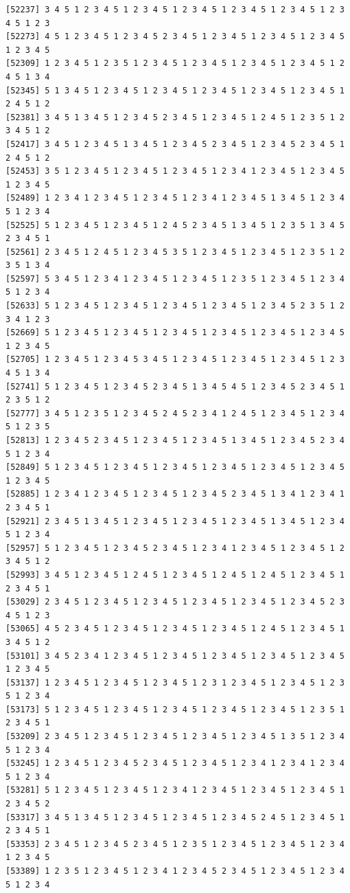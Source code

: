 \documentclass[
  english,
]{book}
\begin{document}
\begin{verbatim}
[52237] 3 4 5 1 2 3 4 5 1 2 3 4 5 1 2 3 4 5 1 2 3 4 5 1 2 3 4 5 1 2 3 4 5 1 2 3
[52273] 4 5 1 2 3 4 5 1 2 3 4 5 2 3 4 5 1 2 3 4 5 1 2 3 4 5 1 2 3 4 5 1 2 3 4 5
[52309] 1 2 3 4 5 1 2 3 5 1 2 3 4 5 1 2 3 4 5 1 2 3 4 5 1 2 3 4 5 1 2 4 5 1 3 4
[52345] 5 1 3 4 5 1 2 3 4 5 1 2 3 4 5 1 2 3 4 5 1 2 3 4 5 1 2 3 4 5 1 2 4 5 1 2
[52381] 3 4 5 1 3 4 5 1 2 3 4 5 2 3 4 5 1 2 3 4 5 1 2 4 5 1 2 3 5 1 2 3 4 5 1 2
[52417] 3 4 5 1 2 3 4 5 1 3 4 5 1 2 3 4 5 2 3 4 5 1 2 3 4 5 2 3 4 5 1 2 4 5 1 2
[52453] 3 5 1 2 3 4 5 1 2 3 4 5 1 2 3 4 5 1 2 3 4 1 2 3 4 5 1 2 3 4 5 1 2 3 4 5
[52489] 1 2 3 4 1 2 3 4 5 1 2 3 4 5 1 2 3 4 1 2 3 4 5 1 3 4 5 1 2 3 4 5 1 2 3 4
[52525] 5 1 2 3 4 5 1 2 3 4 5 1 2 4 5 2 3 4 5 1 3 4 5 1 2 3 5 1 3 4 5 2 3 4 5 1
[52561] 2 3 4 5 1 2 4 5 1 2 3 4 5 3 5 1 2 3 4 5 1 2 3 4 5 1 2 3 5 1 2 3 5 1 3 4
[52597] 5 3 4 5 1 2 3 4 1 2 3 4 5 1 2 3 4 5 1 2 3 5 1 2 3 4 5 1 2 3 4 5 1 2 3 4
[52633] 5 1 2 3 4 5 1 2 3 4 5 1 2 3 4 5 1 2 3 4 5 1 2 3 4 5 2 3 5 1 2 3 4 1 2 3
[52669] 5 1 2 3 4 5 1 2 3 4 5 1 2 3 4 5 1 2 3 4 5 1 2 3 4 5 1 2 3 4 5 1 2 3 4 5
[52705] 1 2 3 4 5 1 2 3 4 5 3 4 5 1 2 3 4 5 1 2 3 4 5 1 2 3 4 5 1 2 3 4 5 1 3 4
[52741] 5 1 2 3 4 5 1 2 3 4 5 2 3 4 5 1 3 4 5 4 5 1 2 3 4 5 2 3 4 5 1 2 3 5 1 2
[52777] 3 4 5 1 2 3 5 1 2 3 4 5 2 4 5 2 3 4 1 2 4 5 1 2 3 4 5 1 2 3 4 5 1 2 3 5
[52813] 1 2 3 4 5 2 3 4 5 1 2 3 4 5 1 2 3 4 5 1 3 4 5 1 2 3 4 5 2 3 4 5 1 2 3 4
[52849] 5 1 2 3 4 5 1 2 3 4 5 1 2 3 4 5 1 2 3 4 5 1 2 3 4 5 1 2 3 4 5 1 2 3 4 5
[52885] 1 2 3 4 1 2 3 4 5 1 2 3 4 5 1 2 3 4 5 2 3 4 5 1 3 4 1 2 3 4 1 2 3 4 5 1
[52921] 2 3 4 5 1 3 4 5 1 2 3 4 5 1 2 3 4 5 1 2 3 4 5 1 3 4 5 1 2 3 4 5 1 2 3 4
[52957] 5 1 2 3 4 5 1 2 3 4 5 2 3 4 5 1 2 3 4 1 2 3 4 5 1 2 3 4 5 1 2 3 4 5 1 2
[52993] 3 4 5 1 2 3 4 5 1 2 4 5 1 2 3 4 5 1 2 4 5 1 2 4 5 1 2 3 4 5 1 2 3 4 5 1
[53029] 2 3 4 5 1 2 3 4 5 1 2 3 4 5 1 2 3 4 5 1 2 3 4 5 1 2 3 4 5 2 3 4 5 1 2 3
[53065] 4 5 2 3 4 5 1 2 3 4 5 1 2 3 4 5 1 2 3 4 5 1 2 4 5 1 2 3 4 5 1 3 4 5 1 2
[53101] 3 4 5 2 3 4 1 2 3 4 5 1 2 3 4 5 1 2 3 4 5 1 2 3 4 5 1 2 3 4 5 1 2 3 4 5
[53137] 1 2 3 4 5 1 2 3 4 5 1 2 3 4 5 1 2 3 1 2 3 4 5 1 2 3 4 5 1 2 3 5 1 2 3 4
[53173] 5 1 2 3 4 5 1 2 3 4 5 1 2 3 4 5 1 2 3 4 5 1 2 3 4 5 1 2 3 5 1 2 3 4 5 1
[53209] 2 3 4 5 1 2 3 4 5 1 2 3 4 5 1 2 3 4 5 1 2 3 4 5 1 3 5 1 2 3 4 5 1 2 3 4
[53245] 1 2 3 4 5 1 2 3 4 5 2 3 4 5 1 2 3 4 5 1 2 3 4 1 2 3 4 1 2 3 4 5 1 2 3 4
[53281] 5 1 2 3 4 5 1 2 3 4 5 1 2 3 4 1 2 3 4 5 1 2 3 4 5 1 2 3 4 5 1 2 3 4 5 2
[53317] 3 4 5 1 3 4 5 1 2 3 4 5 1 2 3 4 5 1 2 3 4 5 2 4 5 1 2 3 4 5 1 2 3 4 5 1
[53353] 2 3 4 5 1 2 3 4 5 2 3 4 5 1 2 3 5 1 2 3 4 5 1 2 3 4 5 1 2 3 4 1 2 3 4 5
[53389] 1 2 3 5 1 2 3 4 5 1 2 3 4 1 2 3 4 5 2 3 4 5 1 2 3 4 5 1 2 3 4 5 1 2 3 4

\end{verbatim}
\end{document}
